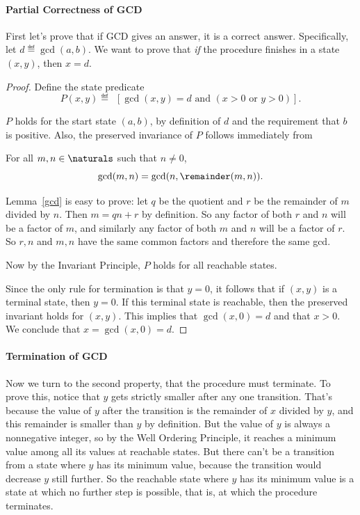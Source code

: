 \paragraph{Partial Correctness of GCD}

First let's prove that if GCD gives an answer, it is a correct answer.
Specifically, let $d \eqdef \gcd(a,b)$.  We want to prove that \emph{if}
the procedure finishes in a state $(x,y)$, then $x = d$.

\begin{proof}
Define the state predicate
\[
P(x,y) \eqdef\ \ [\gcd(x,y) = d \text{ and } (x > 0 \text{ or } y > 0)].
\]

$P$ holds for the start state $(a,b)$, by definition of $d$ and the
requirement that $b$ is positive.  Also, the preserved invariance of
$P$ follows immediately from
\begin{lemma}\label{gcd}
For all $m,n \in \naturals$ such that $n \neq 0$,
\begin{equation}
\gcd(m,n) = \gcd(n,\remainder(m,n)).
\end{equation}
\end{lemma}

Lemma~\ref{gcd} is easy to prove: let $q$ be the quotient and $r$ be
the remainder of $m$ divided by $n$.  Then $m = qn +r$ by definition.
So any factor of both $r$ and $n$ will be a factor of $m$, and
similarly any factor of both $m$ and $n$ will be a factor of $r$.  So
$r,n$ and $m,n$ have the same common factors and therefore the same
gcd.

Now by the Invariant Principle, $P$ holds for all reachable states.

Since the only rule for termination is that $y=0$, it follows that if
$(x,y)$ is a terminal state, then $y=0$.  If this terminal state is
reachable, then the preserved invariant holds for $(x,y)$.  This implies
that $\gcd(x,0) = d$ and that $x>0$.  We conclude that $x = \gcd(x,0) =
d$.
\end{proof}

\paragraph{Termination of GCD}

Now we turn to the second property, that the procedure must terminate.  To
prove this, notice that $y$ gets strictly smaller after any one
transition.  That's because the value of $y$ after the transition is the
remainder of $x$ divided by $y$, and this remainder is smaller than $y$ by
definition.  But the value of $y$ is always a nonnegative integer, so by the
Well Ordering Principle, it reaches a minimum value among all its values
at reachable states.  But there can't be a transition from a state where
$y$ has its minimum value, because the transition would decrease $y$ still
further.  So the reachable state where $y$ has its minimum value is a
state at which no further step is possible, that is, at which the
procedure terminates.

